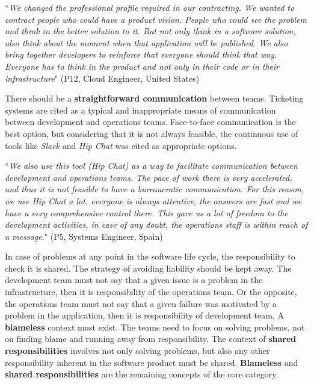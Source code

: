 \begin{mq}
``\emph{We changed the professional profile required in our contracting. We wanted to
contract people who could have a product vision. People who could see the
problem and think in the better solution to it. But not only think in a
software solution, also think about the moment when that application will be
published. We also bring together developers to reinforce that everyone
should think that way. Everyone has to think in the product and not only in
their code or in their infrastructure}" (P12, Cloud Engineer, United States)
\end{mq}

There should be a \textbf{straightforward communication} between teams. Ticketing
systems are cited as a typical and inappropriate means of communication
between development and operations teams. Face-to-face communication is the best
option, but considering that it is not always feasible, the continuous use of
tools like \emph{Slack} and \emph{Hip Chat} was cited as appropriate options.

\begin{mq}
``\emph{We also use this tool (Hip Chat) as a way to facilitate communication between
development and operations teams. The pace of work there is very accelerated, and thus
it is not feasible to have a bureaucratic communication. For this reason, we use Hip Chat
a lot, everyone is always attentive, the answers are fast and we have a very
comprehensive control there. This gave us a lot of freedom to the development
activities, in case of any doubt, the operations staff is within reach of a
message.}" (P5, Systems Engineer, Spain)
\end{mq}

In case of problems at any point in the software life cycle, the responsibility
to check it is shared. The strategy of avoiding liability should be kept away.
The development team must not say that a given issue is a problem in the infrastructure, then
it is responsibility of the operations team. Or the opposite, the operations team
must not say that a given failure was motivated by a problem in the application, then it is
responsibility of development team. A \textbf{blameless} context must exist.
The teams need to focus on solving problems, not on finding blame and
running away from responsibility. The context of \textbf{shared
responsibilities} involves not only solving problems, but also any other
responsibility inherent in the software product must be shared.
\textbf{Blameless} and \textbf{shared responsibilities} are the remaining
concepts of the core category.

